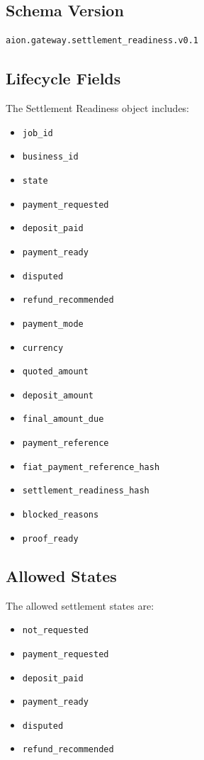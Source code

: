 \subsection{Schema Version}

\begin{verbatim}
aion.gateway.settlement_readiness.v0.1
\end{verbatim}

\subsection{Lifecycle Fields}

The Settlement Readiness object includes:

\begin{itemize}
  \item \texttt{job\_id}
  \item \texttt{business\_id}
  \item \texttt{state}
  \item \texttt{payment\_requested}
  \item \texttt{deposit\_paid}
  \item \texttt{payment\_ready}
  \item \texttt{disputed}
  \item \texttt{refund\_recommended}
  \item \texttt{payment\_mode}
  \item \texttt{currency}
  \item \texttt{quoted\_amount}
  \item \texttt{deposit\_amount}
  \item \texttt{final\_amount\_due}
  \item \texttt{payment\_reference}
  \item \texttt{fiat\_payment\_reference\_hash}
  \item \texttt{settlement\_readiness\_hash}
  \item \texttt{blocked\_reasons}
  \item \texttt{proof\_ready}
\end{itemize}

\subsection{Allowed States}

The allowed settlement states are:

\begin{itemize}
  \item \texttt{not\_requested}
  \item \texttt{payment\_requested}
  \item \texttt{deposit\_paid}
  \item \texttt{payment\_ready}
  \item \texttt{disputed}
  \item \texttt{refund\_recommended}
\end{itemize}

